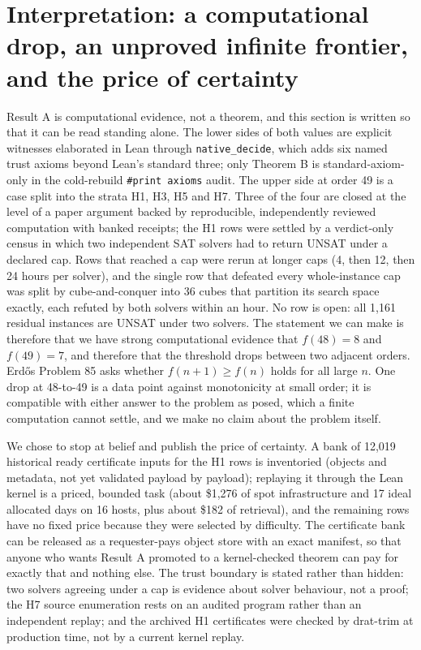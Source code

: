 \documentclass{anvil-paper}
\theoremstyle{definition}
\begin{document}
\section{Interpretation: a computational drop, an unproved infinite frontier, and the price of certainty}\label{sec:interpretation}

Result A is computational evidence, not a theorem, and this section is written so that it can be read standing alone. The lower sides of both values are explicit witnesses elaborated in Lean through \texttt{native\_decide}, which adds six named trust axioms beyond Lean's standard three; only Theorem B is standard-axiom-only in the cold-rebuild \texttt{\#print axioms} audit. The upper side at order 49 is a case split into the strata H1, H3, H5 and H7. Three of the four are closed at the level of a paper argument backed by reproducible, independently reviewed computation with banked receipts; the H1 rows were settled by a verdict-only census in which two independent SAT solvers had to return UNSAT under a declared cap. Rows that reached a cap were rerun at longer caps (4, then 12, then 24 hours per solver), and the single row that defeated every whole-instance cap was split by cube-and-conquer into 36 cubes that partition its search space exactly, each refuted by both solvers within an hour. No row is open: all 1,161 residual instances are UNSAT under two solvers. The statement we can make is therefore that we have strong computational evidence that $f(48)=8$ and $f(49)=7$, and therefore that the threshold drops between two adjacent orders. Erdős Problem 85 asks whether $f(n+1)\ge f(n)$ holds for all large $n$. One drop at 48-to-49 is a data point against monotonicity at small order; it is compatible with either answer to the problem as posed, which a finite computation cannot settle, and we make no claim about the problem itself.

We chose to stop at belief and publish the price of certainty. A bank of 12,019 historical ready certificate inputs for the H1 rows is inventoried (objects and metadata, not yet validated payload by payload); replaying it through the Lean kernel is a priced, bounded task (about \$1,276 of spot infrastructure and 17 ideal allocated days on 16 hosts, plus about \$182 of retrieval), and the remaining rows have no fixed price because they were selected by difficulty. The certificate bank can be released as a requester-pays object store with an exact manifest, so that anyone who wants Result A promoted to a kernel-checked theorem can pay for exactly that and nothing else. The trust boundary is stated rather than hidden: two solvers agreeing under a cap is evidence about solver behaviour, not a proof; the H7 source enumeration rests on an audited program rather than an independent replay; and the archived H1 certificates were checked by drat-trim at production time, not by a current kernel replay.
\end{document}
